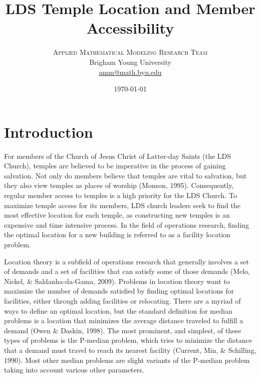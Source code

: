 \documentclass[twoside,twocolumn]{article}
\title{LDS Temple Location and Member Accessibility} %
\author{%
\textsc{Applied Mathematical Modeling Research Team}\\[1ex] %
\normalsize Brigham Young University  \\ %
\normalsize \href{mailto:amm@math.byu.edu}{amm@math.byu.edu} %
}
\date{\today} %
\begin{document}
\maketitle



\section{Introduction}

For members of the Church of Jesus Christ of Latter-day Saints (the LDS Church), temples are believed to be imperative in the process of gaining salvation.
Not only do members believe that temples are vital to salvation, but they also view temples as places of worship (Monson, 1995). %
Consequently, regular member access to temples is a high priority for the LDS Church. %
To maximize temple access for its members, LDS church leaders seek to find the most effective location for each temple, as constructing new temples is an expensive and time intensive process.
In the field of operations research, finding the optimal location for a new building is referred to as a facility location problem.

Location theory is a subfield of operations research that generally involves a set of demands and a set of facilities that can satisfy some of those demands (Melo, Nickel, \& Saldanha-da-Gama, 2009).
Problems in location theory want to maximize the number of demands satisfied by finding optimal locations for facilities, either through adding facilities or relocating.
There are a myriad of ways to define an optimal location, but the standard definition for median problems is a location that minimizes the average distance traveled to fulfill a demand (Owen \& Daskin, 1998).
The most prominent, and simplest, of these types of problems is the P-median problem, which tries to minimize the distance that a demand must travel to reach its nearest facility (Current, Min, \& Schilling, 1990).
Most other median problems are slight variants of the P-median problem taking into account various other parameters.
\end{document}
